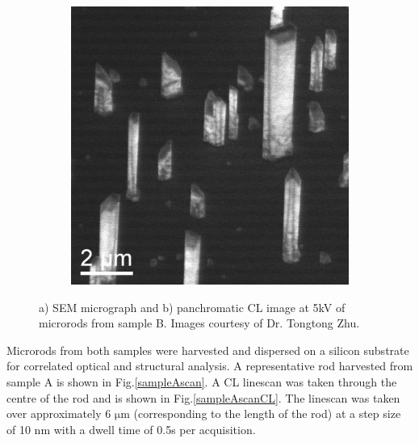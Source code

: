 \begin{figure}[th]
\begin{subfigure}[b]{0.4\textwidth}
	\end{subfigure}%
	\hspace*{1.5cm}
	\begin{subfigure}[b]{0.4\textwidth}
		\centering
		\includegraphics[width=1\linewidth]{Figs/Ch6/CL_7481x}
		\caption{}
	\end{subfigure}%
	
	\caption{a) SEM micrograph and b) panchromatic CL image at 5kV of microrods from sample B. Images courtesy of Dr. Tongtong Zhu.}
	\label{Bsub}
\end{figure}
\FloatBarrier

Microrods from both samples were harvested and dispersed on a silicon substrate for correlated optical and structural analysis. A representative rod harvested from sample A is shown in Fig.\ref{sampleAscan}. A CL linescan was taken through the centre of the rod and is shown in Fig.\ref{sampleAscanCL}. The linescan was taken over approximately 6  $\mathrm{\mu}$m (corresponding to the length of the rod) at a step size of 10 nm with a dwell time of 0.5s per acquisition.

